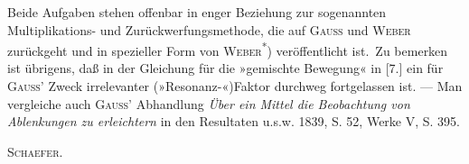 Beide Aufgaben stehen offenbar in enger Beziehung zur sogenannten Multiplikations- und Zurückwerfungsmethode,
die auf \textsc{Gauss} und \textsc{Weber} zurückgeht und in spezieller Form von \textsc{Weber}\textsuperscript{*}) veröffentlicht
ist.\begingroup\renewcommand{\thefootnote}{}\endgroup\ Zu bemerken ist übrigens, daß in der Gleichung für die »gemischte Bewegung« in [7.] ein für \textsc{Gauss}’
Zweck irrelevanter (»Resonanz-«)Faktor durchweg fortgelassen ist. — Man vergleiche auch \textsc{Gauss}’ Abhandlung
\textit{Über ein Mittel die Beobachtung von Ablenkungen zu erleichtern} in den Resultaten u.s.w. 1839,
S. 52, Werke V, S. 395.
\par\raggedleft\textsc{Schaefer}.\par
\clearpage\endgroup\endgroup
